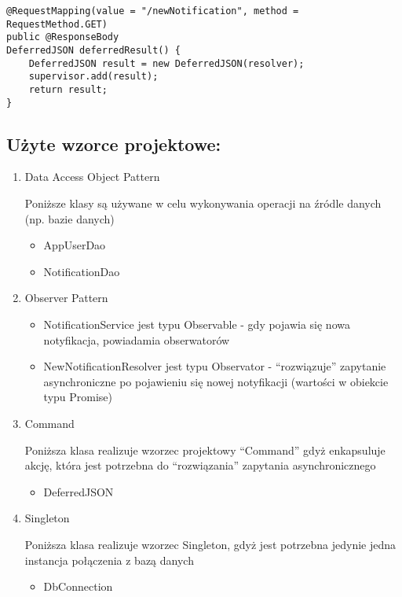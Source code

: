 \documentclass[]{article}
\providecommand{\tightlist}{%
  \setlength{\itemsep}{0pt}\setlength{\parskip}{0pt}}
\begin{document}
\begin{verbatim}
@RequestMapping(value = "/newNotification", method = RequestMethod.GET)
public @ResponseBody
DeferredJSON deferredResult() {
    DeferredJSON result = new DeferredJSON(resolver);
    supervisor.add(result);
    return result;
}
\end{verbatim}

\hypertarget{uux17cyte-wzorce-projektowe}{%
\subsection{Użyte wzorce
projektowe:}\label{uux17cyte-wzorce-projektowe}}

\begin{enumerate}
\def\labelenumi{\arabic{enumi}.}
\item
  Data Access Object Pattern

  Poniższe klasy są używane w celu wykonywania operacji na źródle danych
  (np. bazie danych)

  \begin{itemize}
  \tightlist
  \item
    AppUserDao
  \item
    NotificationDao
  \end{itemize}
\item
  Observer Pattern

  \begin{itemize}
  \tightlist
  \item
    NotificationService jest typu Observable - gdy pojawia się nowa
    notyfikacja, powiadamia obserwatorów
  \item
    NewNotificationResolver jest typu Observator - ``rozwiązuje''
    zapytanie asynchroniczne po pojawieniu się nowej notyfikacji
    (wartości w obiekcie typu Promise)
  \end{itemize}
\item
  Command

  Poniższa klasa realizuje wzorzec projektowy ``Command'' gdyż
  enkapsuluje akcję, która jest potrzebna do ``rozwiązania'' zapytania
  asynchronicznego

  \begin{itemize}
  \tightlist
  \item
    DeferredJSON
  \end{itemize}
\item
  Singleton

  Poniższa klasa realizuje wzorzec Singleton, gdyż jest potrzebna
  jedynie jedna instancja połączenia z bazą danych

  \begin{itemize}
  \tightlist
  \item
    DbConnection
  \end{itemize}
\end{enumerate}
\end{document}
